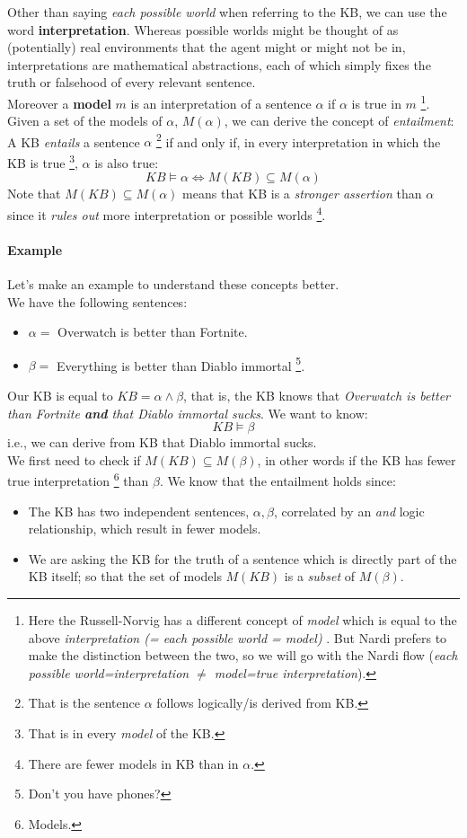 \documentclass[10pt,a4paper]{article}
\begin{document}
Other than saying \textit{each possible world} when referring to the KB, we can use the word \textbf{interpretation}. Whereas possible worlds might be thought of as (potentially) real environments that the agent might or might not be in, interpretations are mathematical abstractions, each of which simply fixes the truth or falsehood of every relevant sentence.\\

Moreover a \textbf{model} $m$ is an interpretation of a sentence $\alpha$ if $\alpha$ is true in $m$ \footnote{Here the Russell-Norvig has a different concept of \textit{model} which is equal to the above \textit{interpretation (= each possible world = model)} . But Nardi prefers to make the distinction between the two, so we will go with the Nardi flow (\textit{each possible world=interpretation $\neq$ model=true interpretation}).}. Given a set of the models of $\alpha$, $M(\alpha)$, we can derive the concept of \textit{entailment}:\\
A KB \textit{entails} a sentence $\alpha$ \footnote{That is the sentence $\alpha$ follows logically/is derived from KB.} if and only if, in every interpretation in which the KB is true \footnote{That is in every \textit{model} of the KB.}, $\alpha$ is also true:
\[KB \models \alpha \Leftrightarrow M(KB) \subseteq M(\alpha)\]
Note that $ M(KB) \subseteq M(\alpha)$ means that KB is a \textit{stronger assertion} than $\alpha$ since it \textit{rules out} more interpretation or possible worlds \footnote{There are fewer models in KB than in $\alpha$.}.

\paragraph{Example} Let's make an example to understand these concepts better.\\
We have the following sentences: 
\begin{itemize}
\item $\alpha=$ Overwatch is better than Fortnite.
\item $\beta=$ Everything is better than Diablo immortal \footnote{Don't you have phones?}.
\end{itemize}
Our KB is equal to $KB=\alpha \wedge \beta$, that is, the KB knows that \textit{Overwatch is better than Fortnite \textbf{and} that Diablo immortal sucks}. We want to know:
\[KB \models \beta\]
i.e., we can derive from KB that Diablo immortal sucks.\\
We first need to check if $M(KB) \subseteq M(\beta)$, in other words if the KB has fewer true interpretation \footnote{Models.} than $\beta$. We know that the entailment holds since:
\begin{itemize}
\item The KB has two independent sentences, $\alpha,\beta$, correlated by an \textit{and} logic relationship, which result in fewer models.
\item  We are asking the KB for the truth of a sentence which is directly part of the KB itself; so that the set of models $M(KB)$ is a \textit{subset} of $M(\beta)$.
\end{itemize}
\end{document}
